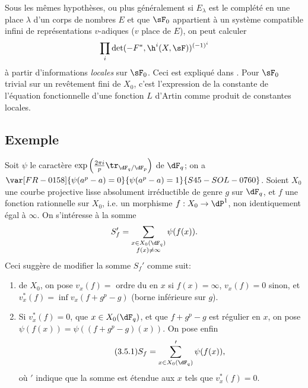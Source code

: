 Sous les mêmes hypothèses, ou plus généralement si $E_\lambda$ est le 
complété en une place $\lambda$ d'un corps de nombres $E$ et que $\sF_0$ 
appartient à un système compatible infini de représentations $v$-adiques 
($v$ place de $E$), on peut calculer 
\[
  \prod_i \det(-F^\ast,\h^i(X,\sF))^{(-1)^i} 
\]
à partir d'informations \emph{locales} sur $\sF_0$. Ceci est expliqué dans 
. Pour $\sF_0$ trivial sur un revêtement fini de $X_0$, c'est 
l'expression de la constante de l'équation fonctionnelle d'une fonction $L$ 
d'Artin comme produit de constantes locales. 





\subsection{Exemple}\label{VI:3-5}

Soit $\psi$ le caractère 
$\exp\left(\frac{2\pi i}{p} \tr_{\dF_q/\dF_p}\right)$ de $\dF_q$; on a 
$\var[FR-0158]{\psi(a^p-a)=0}{\psi(a^p-a)=1}{S45-SOL-0760}$. Soient $X_0$ une courbe projective lisse absolument 
irréductible de genre $g$ sur $\dF_q$, et $f$ une fonction rationnelle sur 
$X_0$, i.e. un morphisme $f:X_0 \to \dP^1$, non identiquement égal à 
$\infty$. On s'intéresse à la somme 
\[
  S_f' = \sum_{\substack{x\in X_0(\dF_q) \\ f(x)\ne \infty}} \psi(f(x)) 
  \text{.}
\]
 Ceci suggère de 
modifier la somme $S_f'$ comme suit: 
\begin{enumerate}[\indent a)]
  \item {} de $X_0$, on pose $v_x(f) = $ ordre du 
     en $x$ si $f(x)=\infty$, $v_x(f)=0$ sinon, et 
    $v_x^\ast(f) = \inf v_x(f+g^p-g)$ (borne inférieure sur $g$). 
  \item Si $v_x^\ast(f)=0$, que $x\in X_0(\dF_q)$, et que $f+g^p-g$ est 
    régulier en $x$, on pose $\psi(f(x)) = \psi((f+g^p-g)(x))$. On pose enfin 
\begin{equation*}\tag{3.5.1}\label{VI:eq:3-5-1}
      S_f = \sum'_{x\in X_0(\dF_q)} \psi(f(x)) \text{,}
    \end{equation*}
    où $\prime$ indique que la somme est étendue aux $x$ tels que 
    $v_x^\ast(f)=0$. 
\end{enumerate}

